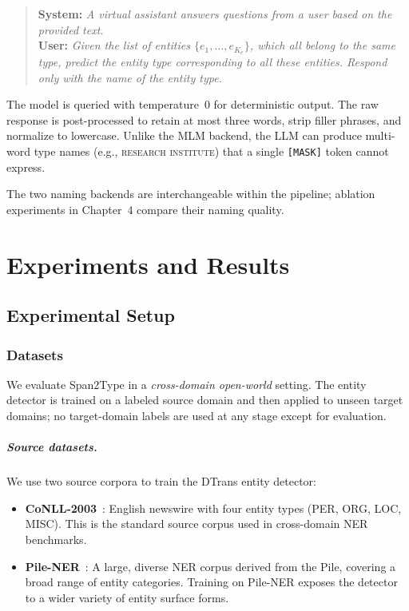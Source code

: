 \documentclass[14pt]{extreport}
\begin{document}
\begin{quote}
\small
\textbf{System:} \textit{A virtual assistant answers questions from a user based on the provided text.}\\[4pt]
\textbf{User:} \textit{Given the list of entities $\{e_1, \ldots, e_{K_e}\}$, which all belong to the same type, predict the entity type corresponding to all these entities. Respond only with the name of the entity type.}
\end{quote}

The model is queried with temperature~0 for deterministic output. The raw response is post-processed to retain at most three words, strip filler phrases, and normalize to lowercase. Unlike the MLM backend, the LLM can produce multi-word type names (e.g., \textsc{research institute}) that a single \texttt{[MASK]} token cannot express.

The two naming backends are interchangeable within the pipeline; ablation experiments in Chapter~4 compare their naming quality.


\chapter{Experiments and Results}\label{sec:Exp}

\section{Experimental Setup}

\subsection{Datasets}

We evaluate Span2Type in a \emph{cross-domain open-world} setting. The entity detector is trained on a labeled source domain and then applied to unseen target domains; no target-domain labels are used at any stage except for evaluation.

\paragraph{Source datasets.}
We use two source corpora to train the DTrans entity detector:
\begin{itemize}
    \item \textbf{CoNLL-2003}~\cite{tjong-kim-sang-de-meulder-2003-introduction}: English newswire with four entity types (PER, ORG, LOC, MISC). This is the standard source corpus used in cross-domain NER benchmarks.
    \item \textbf{Pile-NER}~\cite{zhou-etal-2024-universalner}: A large, diverse NER corpus derived from the Pile, covering a broad range of entity categories. Training on Pile-NER exposes the detector to a wider variety of entity surface forms.
\end{itemize}
\end{document}

